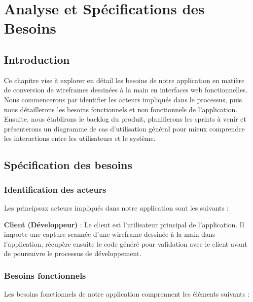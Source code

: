\chapter{Analyse et Spécifications des Besoins}
\label{chap:analyse_specifications_besoins}

\section{Introduction}

Ce chapitre vise à explorer en détail les besoins de notre application en matière de conversion de wireframes dessinées à la main en interfaces web fonctionnelles. Nous commencerons par identifier les acteurs impliqués dans le processus, puis nous détaillerons les besoins fonctionnels et non fonctionnels de l'application. Ensuite, nous établirons le backlog du produit, planifierons les sprints à venir et présenterons un diagramme de cas d'utilisation général pour mieux comprendre les interactions entre les utilisateurs et le système.

\section{Spécification des besoins}

\subsection{Identification des acteurs}

Les principaux acteurs impliqués dans notre application sont les suivants :

\textbf{Client (Développeur)} : Le client est l'utilisateur principal de l'application. Il importe une capture scannée d'une wireframe dessinée à la main dans l'application, récupère ensuite le code généré pour validation avec le client avant de poursuivre le processus de développement.

\subsection{Besoins fonctionnels}

Les besoins fonctionnels de notre application comprennent les éléments suivants :

